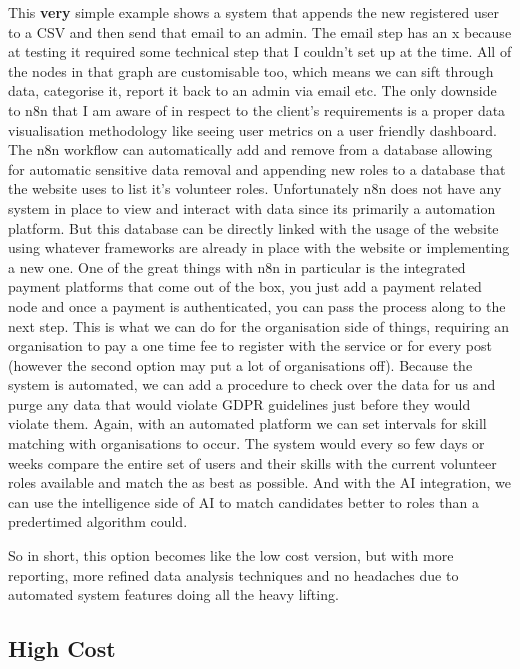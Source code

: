 \documentclass[11pt,a4paper]{article}
\begin{document}
This \textbf{very} simple example shows a system that appends the new registered user to a CSV and then send that email to an admin. The email step has an x because at testing it required some technical step that I couldn't set up at the time. All of the nodes in that graph are customisable too, which means we can sift through data, categorise it, report it back to an admin via email etc. The only downside to n8n that I am aware of in respect to the client's requirements is a proper data visualisation methodology like seeing user metrics on a user friendly dashboard. The n8n workflow can automatically add and remove from a database allowing for automatic sensitive data removal and appending new roles to a database that the website uses to list it's volunteer roles. Unfortunately n8n does not have any system in place to view and interact with data since its primarily a automation platform. But this database can be directly linked with the usage of the website using whatever frameworks are already in place with the website or implementing a new one. One of the great things with n8n in particular is the integrated payment platforms that come out of the box, you just add a payment related node and once a payment is authenticated, you can pass the process along to the next step. This is what we can do for the organisation side of things, requiring an organisation to pay a one time fee to register with the service or for every post (however the second option may put a lot of organisations off). Because the system is automated, we can add a procedure to check over the data for us and purge any data that would violate GDPR guidelines just before they would violate them. Again, with an automated platform we can set intervals for skill matching with organisations to occur. The system would every so few days or weeks compare the entire set of users and their skills with the current volunteer roles available and match the as best as possible. And with the AI integration, we can use the intelligence side of AI to match candidates better to roles than a predertimed algorithm could. 

\hfill \break
So in short, this option becomes like the low cost version, but with more reporting, more refined data analysis techniques and no headaches due to automated system features doing all the heavy lifting. 

\subsection{High Cost}
\end{document}
